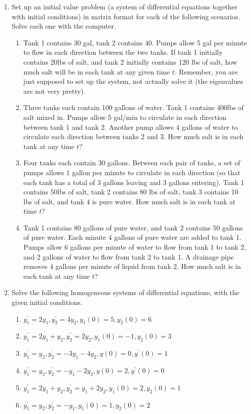 \documentclass[10pt]{article}
\begin{document}
\begin{multicols}{2}
\begin{enumerate}
\item Set up an initial value problem (a system of differential equations together with initial conditions) in matrix format for each of the following scenarios. Solve each one with the computer.
\begin{enumerate}
	\item Tank 1 contains 30 gal, tank 2 contains 40.  Pumps allow 5 gal per minute to flow in each direction between the two tanks.  If tank 1 initially contains 20lbs of salt, and tank 2 initially contains 120 lbs of salt, how much salt will be in each tank at any given time $t$.  Remember, you are just supposed to set up the system, not actually solve it (the eigenvalues are not very pretty).
	\item Three tanks each contain 100 gallons of water. Tank 1 contains 400lbs of salt mixed in.  Pumps allow 5 gal/min to circulate in each direction between tank 1 and tank 2.  Another pump allows 4 gallons of water to circulate each direction between tanks 2 and 3.  How much salt is in each tank at any time $t$?
	\item Four tanks each contain 30 gallons. Between each pair of tanks, a set of pumps allows 1 gallon per minute to circulate in each direction (so that each tank has a total of 3 gallons leaving and 3 gallons entering). Tank 1 contains 50lbs of salt, tank 2 contains 80 lbs of salt, tank 3 contains 10 lbs of salt, and tank 4 is pure water. How much salt is in each tank at time $t$?
	\item Tank 1 contains 80 gallons of pure water, and tank 2 contains 50 gallons of pure water.  Each minute 4 gallons of pure water are added to tank 1. Pumps allow 6 gallons per minute of water to flow from tank 1 to tank 2, and 2 gallons of water to flow from tank 2 to tank 1.  A drainage pipe removes 4 gallons per minute of liquid from tank 2. How much salt is in each tank at any time $t$?
\end{enumerate}


\item Solve the following homogeneous systems of differential equations, with the given initial conditions.
\begin{enumerate}
	\item $y_1^\prime=2y_1, y_2^\prime=4y_2, y_1(0)=5, y_2(0)=6$
	\item $y_1^\prime=2y_1+y_2, y_2^\prime=2y_2, y_1(0)=-1, y_2(0)=3$
	\item $y_1^\prime = y_2, y_2^\prime =-3y_1 -4y_2, y(0)=0, y^\prime(0)=1$
	\item $y_1^\prime = y_2, y_2^\prime =-y_1 -2y_2, y(0)=2, y^\prime(0)=0$
	\item $y_1^\prime=2y_1+y_2, y_2^\prime=y_1+2y_2, y_1(0)=2, y_2(0)=1$
	\item $y_1^\prime=y_2, y_2^\prime=-y_1, y_1(0)=1, y_2(0)=2$
\end{enumerate}

\end{enumerate}
\end{multicols}
\end{document}

